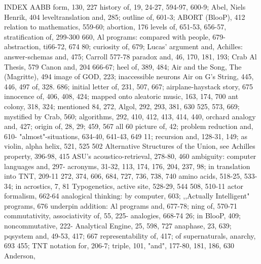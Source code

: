 
                                           INDEX
AABB form, 130, 227                               history of, 19, 24-27, 594-97, 600-9;
Abel, Niels Henrik, 404                           leveltranslation and, 285; outline of, 601-3;
ABORT (BlooP), 412                                relation      to    mathematics,     559-60;
abortion, 176 levels of, 651-53, 656-57,          stratification of, 299-300
660,                                              Al programs: compared with people, 679-
abstraction, ti66-72, 674                         80; curiosity of, 679; Lucas' argument and,
Achilles: answer-schemas and, 475; Carroll        577-78
paradox and, 46, 170, 181, 193; Crab              Al Thesis, 579
Canon and, 204 666-67; heel of, 389, 484;         Air and the Song, The (Magritte), 494
image of GOD, 223; inaccessible neurons           Air on G's String, 445, 446, 497
of, 328. 686; initial letter of, 231, 507, 667;   airplane-haystack story, 675
innocence of, 406, 408, 424; mapped onto          aleatoric music, 163, 174, 700
ant colony, 318, 324; mentioned 84, 272,          Algol, 292, 293, 381, 630
525, 573, 669; mystified by Crab, 560;            algorithms, 292, 410, 412, 413, 414, 440,
orchard analogy and, 427; origin of, 28, 29;      459, 567 all 60
picture of, 42; problem reduction and, 610-       "almost"-situations, 634-40, 641-43, 649
11; recursion and, 128-31, 149; as violin,        alpha helix, 521, 525
502                                               Alternative Structures of the Union, see
Achilles property, 396-98, 415                    ASU's
acoustico-retrieval, 278-80, 460                  ambiguity: computer languages and, 297-
acronyms, 31-32, 113, 174, 176, 204, 237,         98; in translation into TNT, 209-11
272, 374, 606, 684, 727, 736, 738, 740            amino acids, 518-25, 533-34; in
acrostics, 7, 81                                  Typogenetics,
active site, 528-29, 544                          508, 510-11
actor formalism, 662-64                           analogical thinking: by computer, 603;
,,Actually Intelligent" programs, 676             underpin
addition: Al programs and, 677-78;                ning of, 570-71
commutativity, associativity of, 55, 225-         analogies, 668-74
26; in BlooP, 409; noncommutative, 222-           Analytical Engine, 25, 598, 727 anaphase,
23, 639; pqsystem and, 49-53, 417;                667
representability of, 417; of supernaturals,       anarchy, 693
455; TNT notation for, 206-7; triple, 101,        "and", 177-80, 181, 186, 630 Anderson,
